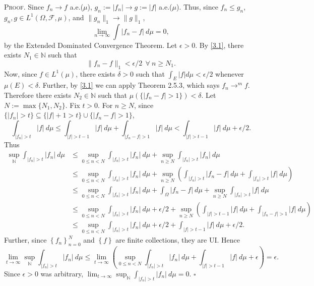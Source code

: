 \documentclass[12pt]{article}
\newcounter{ProofCounter}
\newenvironment{Proof}{\stepcounter{ProofCounter}\textsc{Proof.}}{\hfill$\square$}
\begin{document}
\begin{Proof}
Since $f_{n} \rightarrow f$ a.e.($\mu$), $g_{n} := |f_{n}| \rightarrow g := |f|$ a.e.($\mu$). Thus, since $f_{n} \leq g_n$, $g_{n}, g \in
L^{1}(\Omega, \mathcal{F}, \mu)$, and $\|g_{n}\|_{1} \rightarrow \|g\|_{1}$,
\begin{equation}
\lim_{n\rightarrow\infty}\int |f_{n} - f|\ d\mu = 0,
\label{3.1}
\end{equation}
by the Extended Dominated Convergence Theorem. Let $\epsilon > 0$. By \eqref{3.1}, there exists $N_{1} \in \mathbb{N}$ such that 
\begin{equation}
\|f_{n} - f\|_{1} < \epsilon/2 \ \ \forall \ n \geq N_{1}. 
\label{3.2}
\end{equation}
Now, since $f \in L^{1}(\mu)$, there exists $\delta > 0$ such that $\int_{E}|f|d\mu < \epsilon / 2$ whenever $\mu(E) < \delta$.
Further, by \eqref{3.1} we can apply Theorem 2.5.3, which says $f_{n} \rightarrow^{m} f$. Therefore there exists $N_{2} \in \mathbb{N}$ such that 
$\mu\left( \{|f_{n} - f| > 1\} \right) < \delta$. Let $N := \max\{N_{1}, N_{2}\}$.
Fix $t > 0$. For $n \geq N$, since
$\{|f_{n}| > t\} \subseteq \{|f| + 1 > t\} \cup \{ |f_{n} - f| > 1\}$,
\begin{equation}
\int_{|f_{n}| > t}|f|\ d\mu \leq \int_{|f| > t - 1}|f| \ d\mu + \int_{|f_{n}-f|>1}|f|\ d\mu < \int_{|f| > t -1}|f|\ d\mu + \epsilon/2.
\label{3.3}
\end{equation}
Thus
\begin{align*}
\sup_{\mathbb{N}} \int_{|f_{n}| > t}|f_{n}|\ d\mu & \leq \sup_{0\leq n < N}\int_{|f_{n}| > t}|f_{n}|\ d\mu + \sup_{n\geq N}\int_{|f_{n}| > t}|f_{n}|\
d\mu \\
& \leq \sup_{0\leq n < N}\int_{|f_{n}| > t}|f_{n}|\ d\mu + \sup_{n\geq N}\left(\int_{|f_{n}| > t}|f_{n} - f|\ d\mu + \int_{|f_{n}|>t}|f|\ d\mu\right) \\
& \leq \sup_{0\leq n < N}\int_{|f_{n}| > t}|f_{n}|\ d\mu + \int_{\Omega}|f_{n} - f|\ d\mu + \sup_{n\geq N}\int_{|f_{n}|>t}|f|\ d\mu \\
& \leq \sup_{0\leq n < N}\int_{|f_{n}| > t}|f_{n}|\ d\mu + \epsilon/2 + \sup_{n\geq N}\left(\int_{|f|>t-1}|f|\ d\mu + \int_{|f_{n}-f|>1}|f|\
d\mu\right) \\
& \leq \sup_{0\leq n < N}\int_{|f_{n}| > t}|f_{n}|\ d\mu + \epsilon/2 + \int_{|f|>t-1}|f|\ d\mu + \epsilon / 2.
\end{align*}
Further, since $\left\{ f_{n} \right\}_{n=0}^{N}$ and $\left\{ f \right\}$ are finite collections, they are UI. Hence 
\[ \lim_{t\rightarrow\infty}\sup_{\mathbb{N}}\int_{|f_{n}| > t}|f_{n}|\ d\mu \leq \lim_{t\rightarrow\infty}\left( \sup_{0\leq n < N}\int_{|f_{n}| > t}
|f_{n}|\ d\mu + \int_{|f| > t -1}|f|\ d\mu + \epsilon \right) = \epsilon. \]
Since $\epsilon > 0$ was arbitrary, $\lim_{t\rightarrow\infty}\sup_{\mathbb{N}}\int_{|f_{n}| > t}|f_{n}|\ d\mu = 0$.
\end{Proof}
\end{document}
